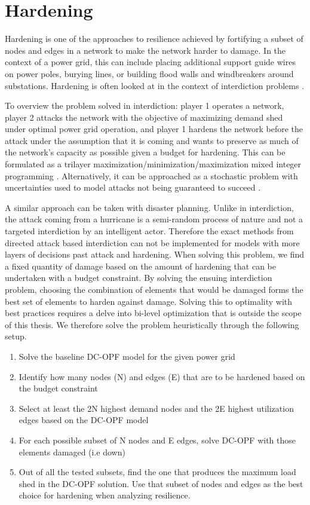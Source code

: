 \section{Hardening}

Hardening is one of the approaches to resilience achieved by fortifying a subset of nodes and edges in a network to make the network harder to damage. In the context of a power grid, this can include placing additional support guide wires on power poles, burying lines, or building flood walls and windbreakers around substations. Hardening is often looked at in the context of interdiction problems \cite{ChurchEA2007}.

 To overview the problem solved in interdiction: player 1 operates a network, player 2 attacks the network with the objective of maximizing demand shed under optimal power grid operation, and player 1 hardens the network before the attack under the assumption that it is coming and wants to preserve as much of the network's capacity as possible given a budget for hardening. This can be formulated as a trilayer maximization/minimization/maximization mixed integer programming \cite{Mahmoo2016}. Alternatively, it can be approached as a stochastic problem with uncertainties used to model attacks not being guaranteed to succeed \cite{Ramirez2009}.

A similar approach can be taken with disaster planning. Unlike in interdiction, the attack coming from a hurricane is a semi-random process of nature and not a targeted interdiction by an intelligent actor. Therefore the exact methods from directed attack based interdiction can not be implemented for models with more layers of decisions past attack and hardening. When solving this problem, we find a fixed quantity of damage based on the amount of hardening that can be undertaken with a budget constraint. By solving the ensuing interdiction problem, choosing the combination of elements that would be damaged forms the best set of elements to harden against damage. Solving this to optimality with best practices requires a delve into bi-level optimization that is outside the scope of this thesis. We therefore solve the problem heuristically through the following setup.

\begin{enumerate}
	
	\item Solve the baseline DC-OPF model for the given power grid
	\item Identify how many nodes (N) and edges (E) that are to be hardened based on the budget constraint
	\item Select at least the 2N highest demand nodes and the 2E highest utilization edges based on the DC-OPF model
	\item For each possible subset of N nodes and E edges, solve DC-OPF with those elements damaged (i.e down)
	\item Out of all the tested subsets, find the one that produces the maximum load shed in the DC-OPF solution. Use that subset of nodes and edges as the best choice for hardening when analyzing resilience.
\end{enumerate}

